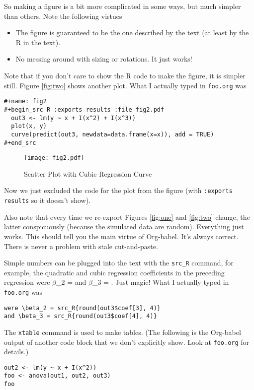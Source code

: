\documentclass[11pt]{article}
\begin{document}
So making a figure is a bit more complicated in some ways, but much simpler
than others.  Note the following virtues
\begin{itemize}
\item The figure is guaranteed to be the one described by the text (at
least by the R in the text).
\item No messing around with sizing or rotations.  It just works!
\end{itemize}

Note that if you don't care to show the R code to make the figure, it
is simpler still.  Figure \ref{fig:two} shows another plot.  What I
actually typed in \texttt{foo.org} was
\begin{verbatim}
#+name: fig2
#+begin_src R :exports results :file fig2.pdf
  out3 <- lm(y ~ x + I(x^2) + I(x^3))
  plot(x, y)
  curve(predict(out3, newdata=data.frame(x=x)), add = TRUE)
#+end_src
\end{verbatim}


\begin{figure}[htbp]
\centering
\texttt{[image: fig2.pdf]}
\caption{\label{fig:org81fac92}
Scatter Plot with Cubic Regression Curve}
\end{figure}

\pagebreak

Now we just excluded the code for the plot from the figure (with
\texttt{:exports results} so it doesn't show).

Also note that every time we re-export Figures \ref{fig:one}
and \ref{fig:two} change, the latter conspicuously (because the
simulated data are random).  Everything just works.  This should tell
you the main virtue of Org-babel.  It's always correct.  There is
never a problem with stale cut-and-paste.

Simple numbers can be plugged into the text with the \texttt{src\_R} command,
for example, the quadratic and cubic regression coefficients in the
preceding regression were \(\beta\)\_2 = and \(\beta\)\_3
= .  Just magic!  What I actually typed
in \texttt{foo.org} was
\begin{verbatim}
were \beta_2 = src_R{round(out3$coef[3], 4)}
and \beta_3 = src_R{round(out3$coef[4], 4)}
\end{verbatim}

The \texttt{xtable} command is used to make tables.  (The following is the
Org-babel output of another code block that we don't explicitly show.
Look at \texttt{foo.org} for details.)
\begin{verbatim}
out2 <- lm(y ~ x + I(x^2))
foo <- anova(out1, out2, out3)
foo
\end{verbatim}
\end{document}
